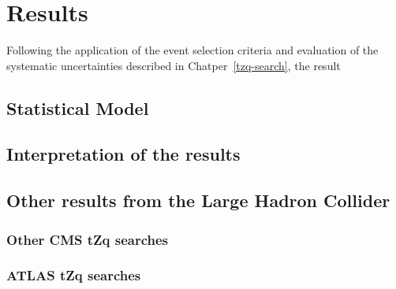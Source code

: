 \chapter{Results}\label{chapter:results}
Following the application of the event selection criteria and evaluation of the systematic uncertainties described in Chatper~\ref{tzq-search}, the result 

\section{Statistical Model}
\section{Interpretation of the results}
\section{Other results from the Large Hadron Collider}
\subsection{Other CMS tZq searches}
\subsection{ATLAS tZq searches}
